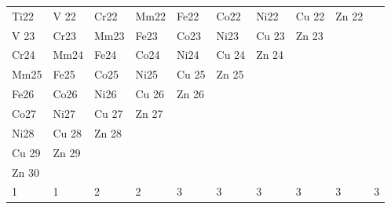 \begin{table}
\begin{center}
\begin{tabular}{llllllllll}
Ti22& V 22& Cr22& Mm22& Fe22& Co22& Ni22& Cu 22& Zn 22\\
V 23& Cr23& Mm23& Fe23& Co23& Ni23& Cu 23& Zn 23\\
Cr24& Mm24& Fe24& Co24& Ni24& Cu 24& Zn 24\\
Mm25& Fe25& Co25& Ni25& Cu 25& Zn 25\\
Fe26& Co26& Ni26& Cu 26& Zn 26\\
Co27& Ni27& Cu 27& Zn 27\\
Ni28& Cu 28& Zn 28\\
Cu 29& Zn 29\\
Zn 30\\
1&1&2&2&3&3&3&3&3&3\\
\hline
\end{tabular}
\end{center}
\end{table}



